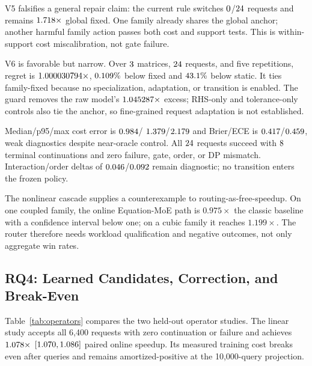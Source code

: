 V5 falsifies a general repair claim: the current rule switches
$0$/$24$ requests and remains
$1.718\times$ global fixed. One family already shares the
global anchor; another harmful family action passes both cost and support tests.
This is within-support cost miscalibration, not gate failure.

V6 is favorable but narrow. Over $3$ matrices,
$24$ requests, and five repetitions, regret is
$1.000030794\times$, $0.109\%$ below fixed
and $43.1\%$ below static. It ties family-fixed because
no specialization, adaptation, or transition is enabled. The guard removes the raw
model's $1.045287\times$ excess; RHS-only and tolerance-only controls also
tie the anchor, so fine-grained request adaptation is not established.

Median/p95/max cost error is $0.984$/
$1.379$/$2.179$ and Brier/ECE is
$0.417$/$0.459$, weak diagnostics despite near-oracle control.
All $24$ requests succeed with $8$ terminal
continuations and zero failure, gate, order, or DP mismatch. Interaction/order deltas
of $0.046$/$0.092$ remain diagnostic; no
transition enters the frozen policy.

The nonlinear cascade supplies a counterexample to routing-as-free-speedup. On one
coupled family, the online Equation-MoE path is $0.975\times$ the classic baseline
with a confidence interval below one; on a cubic family it reaches $1.199\times$.
The router therefore needs workload qualification and negative outcomes, not only
aggregate win rates.

\subsection{RQ4: Learned Candidates, Correction, and Break-Even}

Table~\ref{tab:operators} compares the two held-out operator studies. The linear
study accepts all 6,400 requests with zero continuation or failure and achieves
$1.078\times$ $[1.070,1.086]$ paired
online speedup. Its measured training cost breaks
even after \LinearOperatorBreakEven{} queries and remains amortized-positive at the
10,000-query projection.

